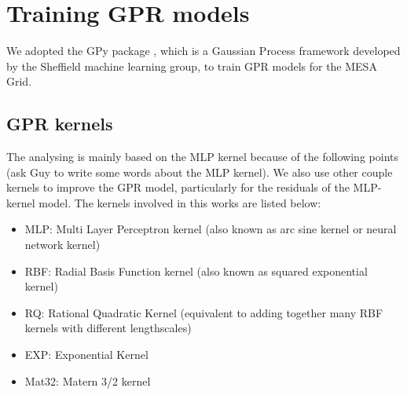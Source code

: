 \section{Training GPR models}\label{GPR}

We adopted the GPy package \citep{gpy2014}, which is a Gaussian Process framework developed by the Sheffield machine learning group, to train GPR models for the \textsc{MESA} Grid. 

\subsection{GPR kernels}
The analysing is mainly based on the MLP kernel because of the following points (ask Guy to write some words about the MLP kernel).
We also use other couple kernels to improve the GPR model, particularly for the residuals of the MLP-kernel model.  
The kernels involved in this works are listed below:

\begin{itemize}
\item MLP: Multi Layer Perceptron kernel (also known as arc sine kernel or neural network kernel)
\item RBF: Radial Basis Function kernel (also known as squared exponential kernel)
\item RQ: Rational Quadratic Kernel (equivalent to adding together many RBF kernels with different lengthscales)
\item EXP: Exponential Kernel
\item Mat32: Matern 3/2 kernel
\end{itemize}


